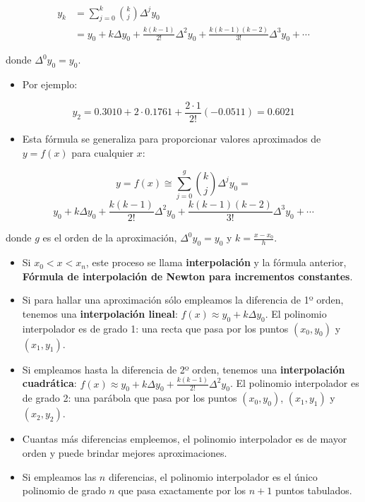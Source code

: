 \documentclass[]{book}
\providecommand{\tightlist}{%
  \setlength{\itemsep}{0pt}\setlength{\parskip}{0pt}}
\begin{document}
\[
\begin{aligned}
y_k & = \sum_{j=0}^k \binom{k}{j} \Delta^{j} y_0 \\
    & = y_0 + k \Delta y_0 + \frac{k(k-1)}{2!}\Delta^2 y_0 + \frac{k(k-1)(k-2)}{3!}\Delta^3 y_0 + \cdots 
\end{aligned}
\]

donde \(\Delta^{0} y_0 = y_0\).

\begin{itemize}
\tightlist
\item
  Por ejemplo:
\end{itemize}

\[
y_2 = 0.3010 + 2 \cdot 0.1761 + \frac{2\cdot 1}{2!} (-0.0511) = 0.6021
\]

\begin{itemize}
\tightlist
\item
  Esta fórmula se generaliza para proporcionar valores aproximados de \(y = f(x)\) para cualquier \(x\):
\end{itemize}

\[
y = f(x) \cong \sum_{j = 0}^{g} \binom{k}{j} \Delta^{j} y_0 = 
\]
\[
y_0 + k \Delta y_0 + \frac{k(k-1)}{2!}\Delta^2 y_0 + \frac{k(k-1)(k-2)}{3!}\Delta^3 y_0 + \cdots
\]

donde \(g\) es el orden de la aproximación, \(\Delta^{0} y_0 = y_0\) y \(k = \frac{x-x_0}{h}\).

\begin{itemize}
\item
  Si \(x_0 < x < x_n\), este proceso se llama \textbf{interpolación} y la fórmula anterior, \textbf{Fórmula de interpolación de Newton para incrementos constantes}.
\item
  Si para hallar una aproximación sólo empleamos la diferencia de 1º orden, tenemos una \textbf{interpolación lineal}: \(f(x) \approx y_0 + k \Delta y_0\). El polinomio interpolador es de grado 1: una recta que pasa por los puntos \((x_0, y_0)\) y \((x_1, y_1)\).
\item
  Si empleamos hasta la diferencia de 2º orden, tenemos una \textbf{interpolación cuadrática}: \(f(x) \approx y_0 + k \Delta y_0 + \frac{k(k-1)}{2!}\Delta^2 y_0\). El polinomio interpolador es de grado 2: una parábola que pasa por los puntos \((x_0, y_0)\), \((x_1, y_1)\) y \((x_2, y_2)\).
\item
  Cuantas más diferencias empleemos, el polinomio interpolador es de mayor orden y puede brindar mejores aproximaciones.
\item
  Si empleamos las \(n\) diferencias, el polinomio interpolador es el único polinomio de grado \(n\) que pasa exactamente por los \(n + 1\) puntos tabulados.
\end{itemize}
\end{document}
